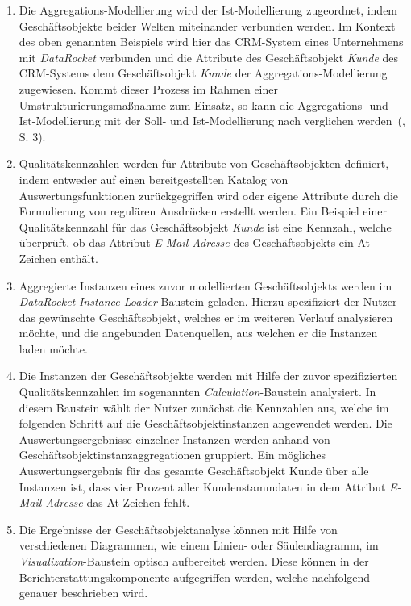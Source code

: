 \documentclass[
  language=german, %
  type=bachelor,%
  ngerman
]{isthesis}
\begin{document}
\begin{content}
\begin{enumerate}
		\item Die Aggregations-Modellierung wird der Ist-Modellierung zugeordnet,
		indem Geschäftsobjekte beider Welten miteinander verbunden werden. Im
		Kontext des oben genannten Beispiels wird hier das \acrshort{CRM}-System
		eines Unternehmens mit \textit{DataRocket} verbunden und die Attribute des
		Geschäftsobjekt \textit{Kunde} des \acrshort{CRM}-Systems dem
		Geschäftsobjekt \textit{Kunde} der Aggregations-Modellierung zugewiesen.
		Kommt dieser Prozess \zB{} im Rahmen einer Umstrukturierungsmaßnahme
		zum Einsatz, so kann die Aggregations- und Ist-Modellierung mit der Soll-
		und Ist-Modellierung nach \textsc{\citeauthor{becker2006konzeptionelle}}
		verglichen werden~(\citeyear{becker2006konzeptionelle}, S. 3).

		\item Qualitätskennzahlen werden für Attribute von Geschäftsobjekten
		definiert, indem entweder auf einen bereitgestellten Katalog von
		Auswertungsfunktionen zurückgegriffen wird oder eigene Attribute durch die
		Formulierung von regulären Ausdrücken erstellt werden. Ein Beispiel einer
		Qualitätskennzahl für das Geschäftsobjekt \textit{Kunde} ist eine Kennzahl,
		welche überprüft, ob das Attribut \textit{E-Mail-Adresse} des
		Geschäftsobjekts ein At-Zeichen enthält.

		\item Aggregierte Instanzen eines zuvor modellierten Geschäftsobjekts
		werden im \textit{DataRocket} \textit{Instance-Loader}-Baustein geladen.
		Hierzu spezifiziert der Nutzer das gewünschte Geschäftsobjekt, welches er
		im weiteren Verlauf analysieren möchte, und die angebunden Datenquellen,
		aus welchen er die Instanzen laden möchte.

		\item Die Instanzen der Geschäftsobjekte werden mit Hilfe der zuvor
		spezifizierten Qualitätskennzahlen im sogenannten
		\textit{Calculation}-Baustein analysiert. In diesem Baustein wählt der
		Nutzer zunächst die Kennzahlen aus, welche im folgenden Schritt auf die
		Geschäftsobjektinstanzen angewendet werden. Die Auswertungsergebnisse
		einzelner Instanzen werden anhand von Geschäftsobjektinstanzaggregationen
		gruppiert. Ein mögliches Auswertungsergebnis für das gesamte
		Geschäftsobjekt Kunde über alle Instanzen ist, dass vier Prozent aller
		Kundenstammdaten in dem Attribut \textit{E-Mail-Adresse} das At-Zeichen
		fehlt.

		\item Die Ergebnisse der Geschäftsobjektanalyse können mit Hilfe von
		verschiedenen Diagrammen, wie \zB{} einem Linien- oder Säulendiagramm, im
		\textit{Visualization}-Baustein optisch aufbereitet werden. Diese können in
		der Berichterstattungskomponente aufgegriffen werden, welche nachfolgend
		genauer beschrieben wird.


\end{enumerate}
\end{content}
\end{document}
